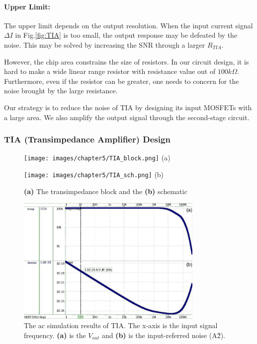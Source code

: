 \paragraph*{Upper Limit:}
The upper limit depends on the output resolution.
When the input current signal $\Delta I$ in Fig.\ref{fig:TIA} is too small, the output response may be defeated by the noise.
This may be solved by increasing the SNR through a larger $R_{TIA}$.
{However, the chip area constrains the size of resistors.
In our circuit design, it is hard to make a wide linear range resistor with resistance value out of $100k\Omega$.
Furthermore, even if the resistor can be greater, one needs to concern for the noise brought by the large resistance.

Our strategy is to reduce the noise of TIA by designing its input MOSFETs with a large area.
We also amplify the output signal through the second-stage circuit.

\subsubsection{TIA (Transimpedance Amplifier) Design}

\begin{figure}[!htb]
    \centering
    \begin{minipage}[t]{0.4\textwidth}
        \texttt{[image: images/chapter5/TIA\_block.png]}
        \raggedleft
        (a)
    \end{minipage}
    \hfill
    \begin{minipage}[t]{0.5\textwidth}
        \texttt{[image: images/chapter5/TIA\_sch.png]}
        \raggedleft
        (b)
    \end{minipage}
    \caption{\textbf{(a)} The transimpedance block and the \textbf{(b)} schematic}
    \label{fig:TIA_sch}
\end{figure}

\begin{figure}[h!tb]
    \centering
        \includegraphics[width=0.8\textwidth] {images/chapter5/postSim/TIA_ac.jpg}
    \caption{The ac simulation results of TIA. The x-axis is the input signal frequency. \textbf{(a)} is the $V_{out}$ and \textbf{(b)} is the input-referred noise (A\^2).}
    \label{fig:TIA_postSim_ac}
\end{figure}

}
